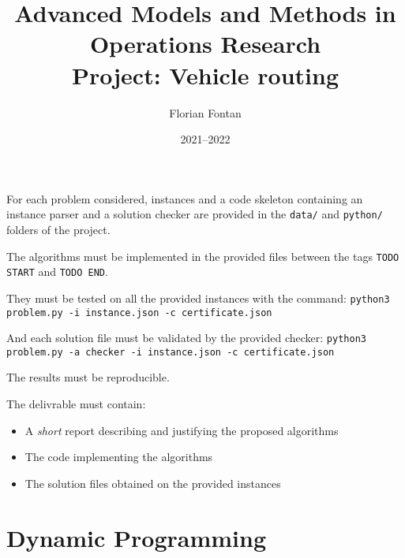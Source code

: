 \documentclass[a4paper,twocolumn]{article}
\author{Florian Fontan}
\title{Advanced Models and Methods in Operations Research \\ Project: Vehicle routing}
\date{2021--2022}
\begin{document}
\maketitle

For each problem considered, instances and a code skeleton containing an instance parser and a solution checker are provided in the \texttt{data/} and \texttt{python/} folders of the project.

The algorithms must be implemented in the provided files between the tags \texttt{TODO START} and \texttt{TODO END}.

They must be tested on all the provided instances with the command:
\texttt{python3 problem.py -i instance.json -c certificate.json}

And each solution file must be validated by the provided checker:
\texttt{python3 problem.py -a checker -i instance.json -c certificate.json}

The results must be reproducible.

\bigskip

The delivrable must contain:
\begin{itemize}
  \item A \emph{short} report describing and justifying the proposed algorithms
  \item The code implementing the algorithms
  \item The solution files obtained on the provided instances
\end{itemize}

\section{Dynamic Programming}
\end{document}
